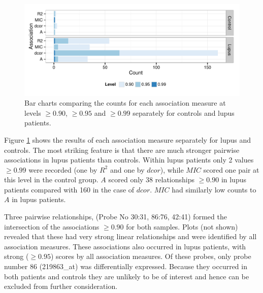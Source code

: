 \documentclass[a4paper, 12pt]{report}
\begin{document}
\begin{figure}[H]
\begin{centering}
\includegraphics[width=\textwidth]{associationLevels.pdf}
\caption{Bar charts comparing the counts for each association measure at levels $\ge 0.90$, $\ge 0.95$ and $\ge 0.99$ separately for controls and lupus patients.} 
\label{F:levels}
\end{centering}
\end{figure}

Figure \ref{F:levels} shows the results of each association measure separately for lupus and controls. The most striking feature is that there are much stronger pairwise associations in lupus patients than controls. Within lupus patients only 2 values $\ge 0.99$ were recorded (one by $R^2$ and one by $dcor$), while $MIC$ scored one pair at this level in the control group. $A$ scored only 38 relationships $\ge 0.90$ in lupus patients compared with 160 in the case of $dcor$. $MIC$ had similarly low counts to $A$ in lupus patients.

Three pairwise relationships, (Probe No 30:31, 86:76, 42:41) formed the intersection of the associations $\ge 0.90$ for both samples. Plots (not shown) revealed that these had very strong linear relationships and were identified by all association measures. These associations also occurred in lupus patients, with strong ($\ge 0.95$) scores by all association measures. Of these probes, only probe number 86 (219863\_at) was differentially expressed. Because they occurred in both patients and controls they are unlikely to be of interest and hence can be excluded from further consideration. 

\end{document}
